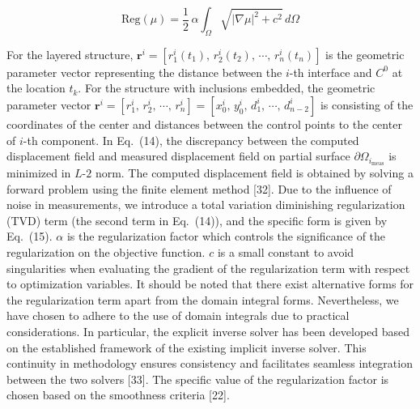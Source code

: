 \documentclass[11pt]{article}
\begin{document}
\vspace{1em}

\noindent
\begin{equation}
\text{Reg}(\mu) = \dfrac{1}{2}\,\alpha \int_{\Omega}
\sqrt{|\nabla\mu|^{2} + c^{2}}\, d\Omega
\end{equation}

\vspace{0.3em}

\noindent
For the layered structure,
$\mathbf{r}^i = \left[r^i_1(t_1),\, r^i_2(t_2),\, \cdots,\, r^i_n(t_n)\right]$
is the geometric parameter vector representing the distance between
the $i$-th interface and $C^0$ at the location $t_k$. For the
structure with inclusions embedded, the geometric parameter vector
$\mathbf{r}^i = \left[r^i_1,\, r^i_2,\, \cdots,\, r^i_n\right]
= \left[x^i_0,\, y^i_0,\, d^i_1,\, \cdots,\, d^i_{n-2}\right]$
is consisting of the coordinates of the center and distances between
the control points to the center of $i$-th component. In Eq.~(14),
the discrepancy between the computed displacement field and measured
displacement field on partial surface $\partial\Omega_{i_{\text{meas}}}$
is minimized in $L$-$2$ norm. The computed displacement field is
obtained by solving a forward problem using the finite element method
[32]. Due to the influence of noise in measurements, we introduce a
total variation diminishing regularization (TVD) term (the second
term in Eq.~(14)), and the specific form is given by Eq.~(15).
$\alpha$ is the regularization factor which controls the significance
of the regularization on the objective function. $c$ is a small
constant to avoid singularities when evaluating the gradient of the
regularization term with respect to optimization variables. It should
be noted that there exist alternative forms for the regularization
term apart from the domain integral forms. Nevertheless, we have
chosen to adhere to the use of domain integrals due to practical
considerations. In particular, the explicit inverse solver has been
developed based on the established framework of the existing
implicit inverse solver. This continuity in methodology ensures
consistency and facilitates seamless integration between the two
solvers [33]. The specific value of the regularization factor is
chosen based on the smoothness criteria [22].

\newpage

\setcounter{equation}{15}
\end{document}
